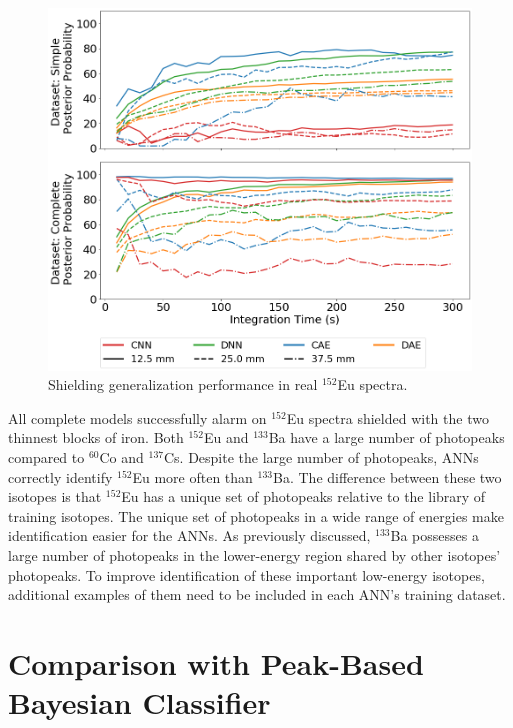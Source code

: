 \begin{figure}[H]
	\centering
	\includegraphics[width=0.8\linewidth]{images/iron_eu152}
	\caption{Shielding generalization performance in real $^{152}$Eu spectra.}
	\label{fig:iron_eu152}
\end{figure}

All complete models successfully alarm on $^{152}$Eu spectra shielded with the two thinnest blocks of iron. Both $^{152}$Eu and $^{133}$Ba have a large number of photopeaks compared to $^{60}$Co and $^{137}$Cs. Despite the large number of photopeaks, ANNs correctly identify $^{152}$Eu more often than $^{133}$Ba. The difference between these two isotopes is that $^{152}$Eu has a unique set of photopeaks relative to the library of training isotopes. The unique set of photopeaks in a wide range of energies make identification easier for the ANNs. As previously discussed, $^{133}$Ba possesses a large number of photopeaks in the lower-energy region shared by other isotopes' photopeaks. To improve identification of these important low-energy isotopes, additional examples of them need to be included in each ANN's training dataset.

\section{Comparison with Peak-Based Bayesian Classifier}

